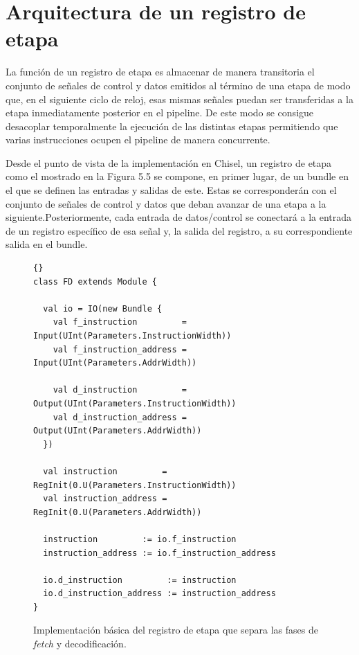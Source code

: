 \section{Arquitectura de un registro de etapa}

La función de un registro de etapa es almacenar de manera transitoria el conjunto de señales de control y datos emitidos al término de una etapa de modo que, en el siguiente ciclo de reloj, esas mismas señales puedan ser transferidas a la etapa inmediatamente posterior en el pipeline. De este modo se consigue desacoplar temporalmente la ejecución de las distintas etapas permitiendo que varias instrucciones ocupen el pipeline de manera concurrente.

Desde el punto de vista de la implementación en Chisel, un registro de etapa como el mostrado en la Figura 5.5 se compone, en primer lugar, de un bundle en el que se definen las entradas y salidas de este. Estas se corresponderán con el conjunto de señales de control y datos que deban avanzar de una etapa a la siguiente.Posteriormente, cada entrada de datos/control se conectará a la entrada de un registro específico de esa señal y, la salida del registro, a su correspondiente salida en el bundle.

\vspace{+0.25cm}
\begin{figure}[h]
\begin{lstlisting}[style=scalaStyle,columns=fullflexible]{}
class FD extends Module {

  val io = IO(new Bundle {
    val f_instruction         = Input(UInt(Parameters.InstructionWidth))
    val f_instruction_address = Input(UInt(Parameters.AddrWidth))

    val d_instruction         = Output(UInt(Parameters.InstructionWidth))
    val d_instruction_address = Output(UInt(Parameters.AddrWidth))
  })

  val instruction         = RegInit(0.U(Parameters.InstructionWidth))
  val instruction_address = RegInit(0.U(Parameters.AddrWidth))

  instruction         := io.f_instruction
  instruction_address := io.f_instruction_address

  io.d_instruction         := instruction
  io.d_instruction_address := instruction_address
}
\end{lstlisting}
\vspace{-0.4cm}
\caption{Implementación básica del registro de etapa que separa las fases de \textit{fetch} y decodificación.}
\end{figure}


